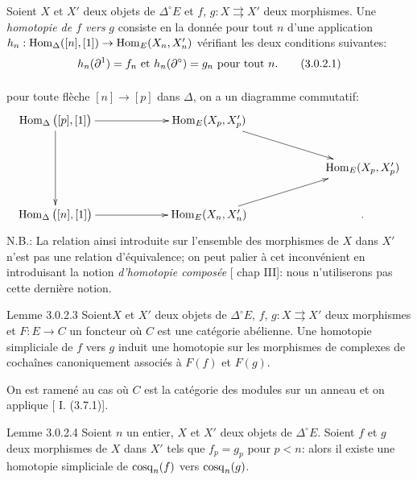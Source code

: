 \documentclass[10pt]{../fichiers-configuration-latex/smfart}
\begin{document}
\subsubsection{}
Soient $X$ et $X'$ deux objets de $\Delta^{\circ} E$ et $f$, $g : X
\rightrightarrows X'$ deux morphismes. Une \emph{homotopie de $f$ vers}
$g$ consiste en la donnée pour tout $n$ d'une application $h_n :
\Hom_{\Delta}([n], [1]) \to \Hom_E(X_n, X'_n)$ vérifiant les deux
conditions suivantes:
\begin{equation*}
h_n(\partial^1) = f_n \mbox{ et } h_n(\partial^\circ) = g_n \mbox{
  pour tout } n{}.\tag{3.0.2.1}
\end{equation*}

\setcounter{paragraph}{1}
\paragraph{}
pour toute flèche $[n] \to [p]$ dans $\Delta$, on a un diagramme
commutatif:
\[
\xymatrix@C=2.25cm{
\Hom_{\Delta}\big([p],[1]\big) \ar[r] \ar[dd]      &
\Hom_E(X_p,X'_p) \ar[rd]&\\
                                                  &     & \Hom_E(X_p,X'_p)\\
\Hom_{\Delta}\big([n],[1]\big)    \ar[r]           &  \Hom_E(X_n,X'_n)
\ar[ru]&.
}
\]
N.B.: La relation ainsi introduite sur l'ensemble des morphismes de
$X$ dans $X'$ n'est pas une relation d'équivalence; on peut palier à
cet inconvénient en introduisant la notion \emph{d'homotopie composée}
[\cf \cite{SGA4-05bis:3} chap III]: nous n'utiliserons pas cette dernière notion.

\begin{enonce*}{Lemme 3.0.2.3}
Soient\pageoriginale $X$ et $X'$ deux objets de $\Delta^{\circ} E$,
$f$, $g : X \rightrightarrows X'$ deux morphismes et $F : E \to C$
un foncteur où $C$ est une catégorie abélienne. Une homotopie
simpliciale de $f$ vers $g$ induit une homotopie sur les morphismes
de complexes de cochaînes canoniquement associés à $F(f)$ et $F(g)$.
\end{enonce*}

On est ramené au cas où $C$ est la catégorie des modules sur un anneau
et on applique [\cite{SGA4-05bis:5} I. (3.7.1)].

\begin{enonce*}{Lemme 3.0.2.4}
Soient $n$ un entier, $X$ et $X'$ deux objets de
$\Delta^{\circ}E$. Soient $f$ et $g$ deux morphismes de $X$ dans
$X'$ tels que $f_p = g_p$ pour $p < n$: alors il existe une homotopie
simpliciale de $\operatorname{cosq}_n(f)$ vers $\operatorname{cosq}_n(g)$.
\end{enonce*}
\end{document}
